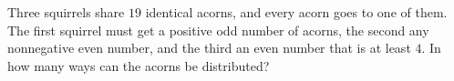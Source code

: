 Three squirrels share $19$ identical acorns, and every acorn goes to one of them. The first squirrel must get a positive odd number of acorns, the second any nonnegative even number, and the third an even number that is at least $4$. In how many ways can the acorns be distributed?
